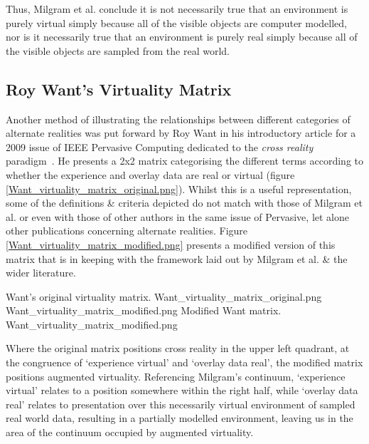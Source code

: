 Thus, Milgram et al. conclude it is not necessarily true that an environment is purely virtual simply because all of the visible objects are computer modelled, nor is it necessarily true that an environment is purely real simply because all of the visible objects are sampled from the real world.


\subsection{Roy Want's Virtuality Matrix}

Another method of illustrating the relationships between different categories of alternate realities was put forward by Roy Want in his introductory article for a 2009 issue of IEEE Pervasive Computing dedicated to the \textit{cross reality} paradigm~\cite{Want2009}. He presents a 2x2 matrix categorising the different terms according to whether the experience and overlay data are real or virtual (figure \ref{Want_virtuality_matrix_original.png}). Whilst this is a useful representation, some of the definitions \& criteria depicted do not match with those of Milgram et al. or even with those of other authors in the same issue of Pervasive, let alone other publications concerning alternate realities. Figure \ref{Want_virtuality_matrix_modified.png} presents a modified version of this matrix that is in keeping with the framework laid out by Milgram et al. \& the wider literature.

 {Want's original virtuality matrix.} {Want_virtuality_matrix_original.png}
       {Want_virtuality_matrix_modified.png} {Modified Want matrix.} {Want_virtuality_matrix_modified.png}

Where the original matrix positions cross reality in the upper left quadrant, at the congruence of `experience virtual' and `overlay data real', the modified matrix positions augmented virtuality. Referencing Milgram's continuum, `experience virtual' relates to a position somewhere within the right half, while `overlay data real' relates to presentation over this necessarily virtual environment of sampled real world data, resulting in a partially modelled environment, leaving us in the area of the continuum occupied by augmented virtuality.


